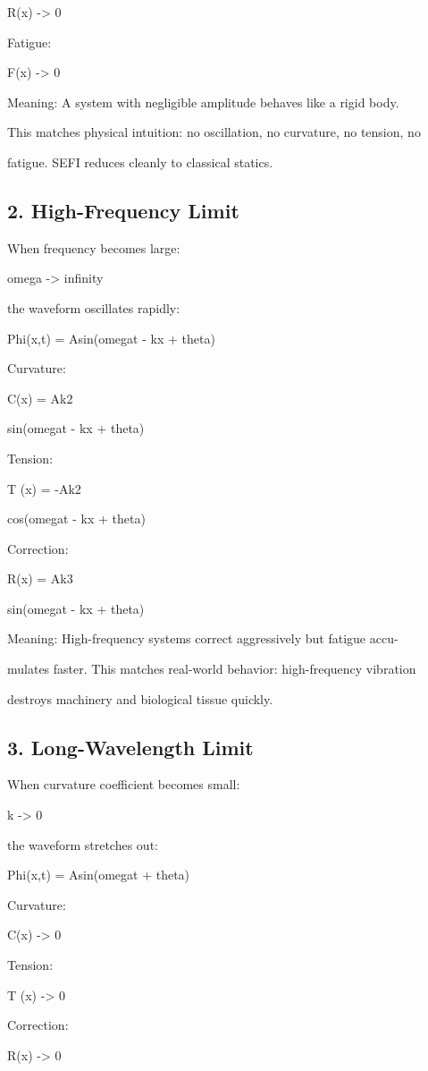\documentclass[10pt]{article}
\begin{document}
R(x) -> 0

Fatigue:

F(x) -> 0

Meaning: A system with negligible amplitude behaves like a rigid body.

This matches physical intuition: no oscillation, no curvature, no tension, no

fatigue. SEFI reduces cleanly to classical statics.

\subsection*{2. High-Frequency Limit}
When frequency becomes large:

omega -> infinity

the waveform oscillates rapidly:

Phi(x,t) = Asin(omegat - kx + theta)

Curvature:

C(x) = Ak2

sin(omegat - kx + theta)

Tension:

T (x) = -Ak2

cos(omegat - kx + theta)

Correction:

R(x) = Ak3

sin(omegat - kx + theta)

Meaning: High-frequency systems correct aggressively but fatigue accu-

mulates faster. This matches real-world behavior: high-frequency vibration

destroys machinery and biological tissue quickly.


\subsection*{3. Long-Wavelength Limit}
When curvature coefficient becomes small:

k -> 0

the waveform stretches out:

Phi(x,t) = Asin(omegat + theta)

Curvature:

C(x) -> 0

Tension:

T (x) -> 0

Correction:

R(x) -> 0
\end{document}
